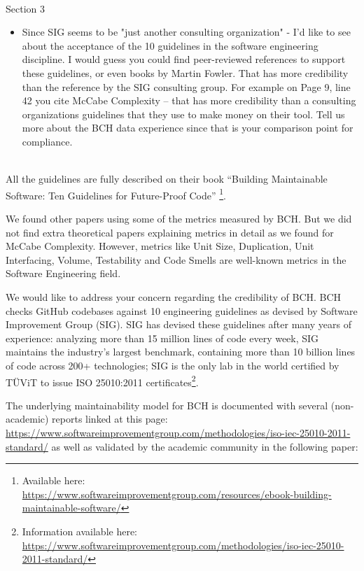 \documentclass[11pt,fleqn]{article}
\newcommand{\eline}{\vspace*{.75\baselineskip}}
\newcommand{\Referee}[1]{\eline \noindent {\bf Reviewer comment #1:} \\}
\newcommand{\Us}{\eline \noindent {\bf Response:}\\}
\newenvironment{revcomment}[1][]
{\Referee{#1}\begin{rcomment}}
{\end{rcomment}}
\begin{document}
\begin{revcomment}[2.12]
    Section 3\\
    \begin{itemize}
        \item Since SIG seems to be "just another consulting organization" - I'd like 
        to see about the acceptance of the 10 guidelines in the software engineering 
        discipline.  I would guess you could find peer-reviewed references to support 
        these guidelines, or even books by Martin Fowler.   That has more credibility 
        than the reference by the SIG consulting group. For example on Page 9, line 42 
        you cite McCabe Complexity --  that has more credibility than a consulting 
        organizations guidelines that they use to make money on their tool.  Tell us more 
        about the BCH data experience since that is your comparison point for compliance.
    \end{itemize}
\end{revcomment}

\Us All the guidelines are fully described on their book ``Building Maintainable 
Software: Ten Guidelines for Future-Proof Code''
\footnote{Available here: \url{https://www.softwareimprovementgroup.com/resources/ebook-building-maintainable-software/}}.

We found other papers using some of the metrics measured by BCH. But we did not find
extra theoretical papers explaining metrics in detail as we found for McCabe Complexity.
However, metrics like Unit Size, Duplication, Unit Interfacing, Volume, Testability
and Code Smells are well-known metrics in the Software Engineering field. 

We would like to address your concern regarding the credibility of BCH. BCH checks GitHub 
codebases against 10 engineering guidelines as devised by Software Improvement Group 
(SIG). SIG has devised these guidelines after many years of experience: analyzing more 
than 15 million lines of code every week, SIG maintains the industry’s largest 
benchmark, containing more than 10 billion lines of code across 200+ technologies; SIG 
is the only lab in the world certified by TÜViT to issue ISO 25010:2011 
certificates\footnote{Information available here: 
\url{https://www.softwareimprovementgroup.com/methodologies/iso-iec-25010-2011-standard/}}.

The underlying maintainability model for BCH is documented with several
(non-academic) reports linked at this page:
\url{https://www.softwareimprovementgroup.com/methodologies/iso-iec-25010-2011-standard/} as 
well as validated by the academic community in the following paper:
\end{document}
